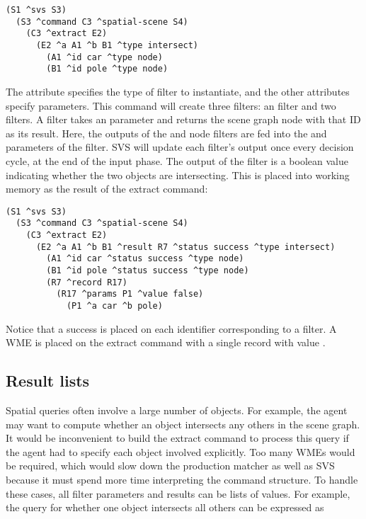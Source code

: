 \begin{verbatim}
(S1 ^svs S3)
  (S3 ^command C3 ^spatial-scene S4)
    (C3 ^extract E2)
      (E2 ^a A1 ^b B1 ^type intersect)
        (A1 ^id car ^type node)
        (B1 ^id pole ^type node)
\end{verbatim}

The  attribute specifies the type of filter to instantiate, and the other attributes specify parameters.
This command will create three filters: an  filter and two  filters.
A  filter takes an  parameter and returns the scene graph node with that ID as its result.
Here, the outputs of the  and  node filters are fed into the  and  parameters of the  filter.
SVS will update each filter's output once every decision cycle, at the end of the input phase.
The output of the  filter is a boolean value indicating whether the two objects are intersecting.
This is placed into working memory as the result of the extract command:

\begin{verbatim}
(S1 ^svs S3)
  (S3 ^command C3 ^spatial-scene S4)
    (C3 ^extract E2)
      (E2 ^a A1 ^b B1 ^result R7 ^status success ^type intersect)
        (A1 ^id car ^status success ^type node)
        (B1 ^id pole ^status success ^type node)
        (R7 ^record R17)
          (R17 ^params P1 ^value false)
            (P1 ^a car ^b pole)
\end{verbatim}

Notice that a  success is placed on each identifier corresponding to a filter.
A  WME is placed on the extract command with a single record with value .


\subsection{Result lists}

Spatial queries often involve a large number of objects.
For example, the agent may want to compute whether an object intersects any others in the scene graph.
It would be inconvenient to build the extract command to process this query if the agent had to specify each object involved explicitly.
Too many WMEs would be required, which would slow down the production matcher as well as SVS because it must spend more time interpreting the command structure.
To handle these cases, all filter parameters and results can be lists of values.
For example, the query for whether one object intersects all others can be expressed as

